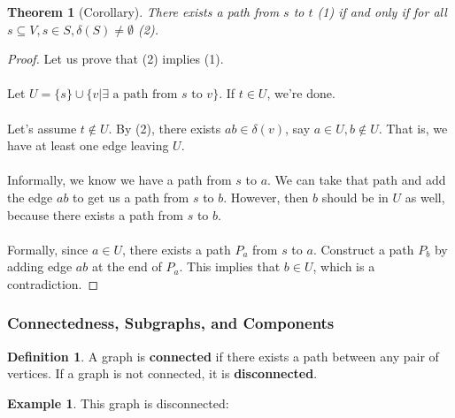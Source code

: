 \documentclass[]{article}
\newtheorem*{theorem}{Theorem}
\theoremstyle{definition}
\newtheorem*{defn}{Definition}
\newtheorem{ex}{Example}[section]
\newcommand{\lecture}[1]{\marginpar{{\footnotesize $\leftarrow$ \underline{#1}}}}
\begin{document}
				\begin{theorem}[Corollary] \lecture{March 4, 2013}
					There exists a path from $s$ to $t$ (1) if and only if for all $s \subseteq V, s \in S, \delta(S) \ne \emptyset$ (2).
				\end{theorem}

				\begin{proof}
					Let us prove that (2) implies (1).
					\\ \\
					Let $U = \{s\} \cup \{v | \exists \text{ a path from } s \text{ to } v\}$. If $t \in U$, we're done. 
					\\ \\
					Let's assume $t \not \in U$. By (2), there exists $ab \in \delta(v)$, say $a \in U, b \not \in U$. That is, we have at least one edge leaving $U$.
					\\ \\
					Informally, we know we have a path from $s$ to $a$. We can take that path and add the edge $ab$ to get us a path from $s$ to $b$. However, then $b$ should be in $U$ as well, because there exists a path from $s$ to $b$.
					\\ \\
					Formally, since $a \in U$, there exists a path $P_a$ from $s$ to $a$. Construct a path $P_b$ by adding edge $ab$ at the end of $P_a$. This implies that $b \in U$, which is a contradiction.
				\end{proof}

			\subsubsection{Connectedness, Subgraphs, and Components}
				\begin{defn}
					A graph is \textbf{connected} if there exists a path between any pair of vertices. If a graph is not connected, it is \textbf{disconnected}.
				\end{defn}
				
				\begin{ex}
					This graph is disconnected:
					\begin{center}
					\end{center}
				\end{ex}
\end{document}
